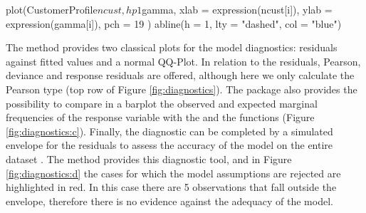 \begin{example}
plot(CustomerProfile$ncust, hp1$gamma,
     xlab = expression(ncust[i]),
     ylab = expression(gamma[i]),
     pch = 19
)
abline(h = 1, lty = "dashed", col = "blue")
\end{example}

The  method provides two classical plots for the model diagnostics: residuals against fitted values and a normal QQ-Plot. In relation to the residuals, Pearson, deviance and response residuals are offered, although here we only calculate the Pearson type (top row of Figure \ref{fig:diagnostics}). The package also provides the possibility to compare in a barplot the observed and expected marginal frequencies of the response variable with the  and the  functions (Figure \ref{fig:diagnostics:c}). Finally, the diagnostic can be completed by a simulated envelope for the residuals to assess the accuracy of the model on the entire dataset \citep{atkinson,GARAY}. The  method provides this diagnostic tool, and in Figure \ref{fig:diagnostics:d} the cases for which the model assumptions are rejected are highlighted in red. In this case there are 5 observations that fall outside the envelope, therefore there is no evidence against the adequacy of the model.


